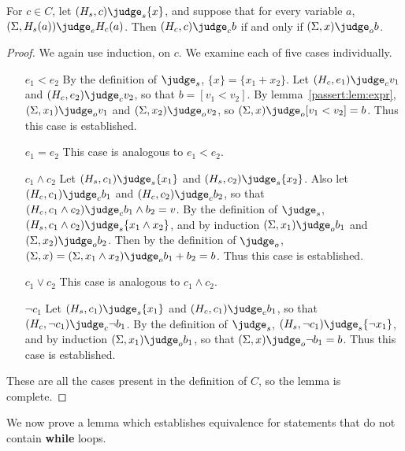 \begin{lemma} \label{passert:lem:cond}
  For $c \in C$, let $(H_s, c) \judge_s \{ x \}$, and suppose that for
  every variable $a$, $(\Sigma, H_s(a)) \judge_e H_c(a)$.  Then $(H_c,
  c) \judge_c b$ if and only if $(\Sigma, x) \judge_o b$.
\end{lemma}

\begin{proof}
We again use induction, on $c$.  We examine each of five cases
individually.

\begin{itemize}
\item[$e_1 < e_2$] By the definition of $\judge_s$, $\{ x \} = \{ x_1
  + x_2 \}$.  Let $(H_c, e_1) \judge_c v_1$ and $(H_c, e_2) \judge_c
  v_2$, so that $b = [v_1 < v_2]$.  By lemma~\ref{passert:lem:expr}, $(\Sigma,
  x_1) \judge_o v_1$ and $(\Sigma, x_2) \judge_o v_2$, so $(\Sigma, x)
  \judge_o [v_1 < v_2] = b$.  Thus this case is established.
\item[$e_1 = e_2$] This case is analogous to $e_1 < e_2$.
\item[$c_1 \wedge c_2$] Let $(H_s, c_1) \judge_s \{ x_1 \}$ and $(H_s,
  c_2) \judge_s \{ x_2 \}$. Also let $(H_c, c_1) \judge_c b_1$ and
  $(H_c, c_2) \judge_c b_2$, so that $(H_c, c_1 \wedge c_2) \judge_c
  b_1 \wedge b_2 = v$.  By the definition of $\judge_s$, $(H_s, c_1
  \wedge c_2) \judge_s \{ x_1 \wedge x_2 \}$, and by induction
  $(\Sigma, x_1) \judge_o b_1$ and $(\Sigma, x_2) \judge_o b_2$.  Then
  by the definition of $\judge_o$, $(\Sigma, x) = (\Sigma, x_1 \wedge
  x_2) \judge_o b_1 + b_2 = b$.  Thus this case is established.
\item[$c_1 \vee c_2$] This case is analogous to $c_1 \wedge c_2$.
\item[$\neg c_1$] Let $(H_s, c_1) \judge_s \{ x_1 \}$ and $(H_c, c_1)
  \judge_c b_1$, so that $(H_c, \neg c_1) \judge_c \neg b_1$.  By the
  definition of $\judge_s$, $(H_s, \neg c_1) \judge_s \{ \neg x_1 \}$,
  and by induction $(\Sigma, x_1) \judge_o b_1$, so that $(\Sigma, x)
  \judge_o \neg b_1 = b$.  Thus this case is established.
\end{itemize}

These are all the cases present in the definition of $C$, so the lemma
is complete.

\end{proof}

We now prove a lemma which establishes equivalence for statements that
do not contain \textbf{while} loops.

